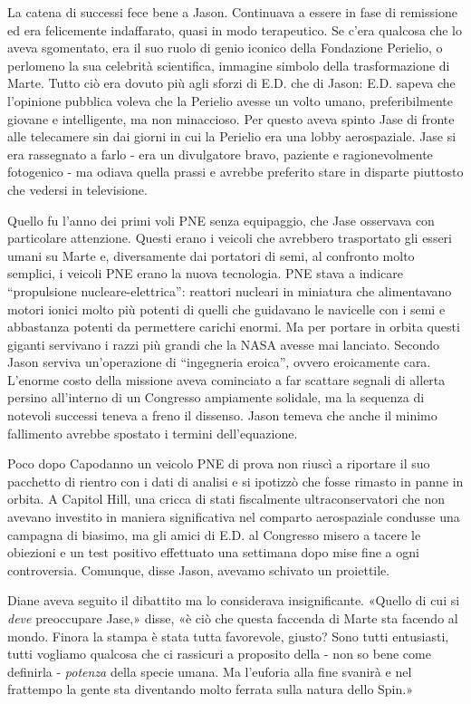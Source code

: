 La catena di successi fece bene a Jason. Continuava a essere in fase di
remissione ed era felicemente indaffarato, quasi in modo terapeutico. Se
c'era qualcosa che lo aveva sgomentato, era il suo ruolo di genio
iconico della Fondazione Perielio, o perlomeno la sua celebrità
scientifica, immagine simbolo della trasformazione di Marte. Tutto ciò
era dovuto più agli sforzi di E.D. che di Jason: E.D. sapeva che
l'opinione pubblica voleva che la Perielio avesse un volto umano,
preferibilmente giovane e intelligente, ma non minaccioso. Per questo
aveva spinto Jase di fronte alle telecamere sin dai giorni in cui la
Perielio era una lobby aerospaziale. Jase si era rassegnato a farlo -
era un divulgatore bravo, paziente e ragionevolmente fotogenico - ma
odiava quella prassi e avrebbe preferito stare in disparte piuttosto che
vedersi in televisione.

Quello fu l'anno dei primi voli PNE senza equipaggio, che Jase osservava
con particolare attenzione. Questi erano i veicoli che avrebbero
trasportato gli esseri umani su Marte e, diversamente dai portatori di
semi, al confronto molto semplici, i veicoli PNE erano la nuova
tecnologia. PNE stava a indicare ``propulsione nucleare-elettrica'':
reattori nucleari in miniatura che alimentavano motori ionici molto più
potenti di quelli che guidavano le navicelle con i semi e abbastanza
potenti da permettere carichi enormi. Ma per portare in orbita questi
giganti servivano i razzi più grandi che la NASA avesse mai lanciato.
Secondo Jason serviva un'operazione di ``ingegneria eroica'', ovvero
eroicamente cara. L'enorme costo della missione aveva cominciato a far
scattare segnali di allerta persino all'interno di un Congresso
ampiamente solidale, ma la sequenza di notevoli successi teneva a freno
il dissenso. Jason temeva che anche il minimo fallimento avrebbe
spostato i termini dell'equazione.

Poco dopo Capodanno un veicolo PNE di prova non riuscì a riportare il
suo pacchetto di rientro con i dati di analisi e si ipotizzò che fosse
rimasto in panne in orbita. A Capitol Hill, una cricca di stati
fiscalmente ultraconservatori che non avevano investito in maniera
significativa nel comparto aerospaziale condusse una campagna di
biasimo, ma gli amici di E.D. al Congresso misero a tacere le obiezioni
e un test positivo effettuato una settimana dopo mise fine a ogni
controversia. Comunque, disse Jason, avevamo schivato un proiettile.

Diane aveva seguito il dibattito ma lo considerava insignificante.
«Quello di cui si \emph{deve} preoccupare Jase,» disse, «è ciò che
questa faccenda di Marte sta facendo al mondo. Finora la stampa è stata
tutta favorevole, giusto? Sono tutti entusiasti, tutti vogliamo qualcosa
che ci rassicuri a proposito della - non so bene come definirla -
\emph{potenza} della specie umana. Ma l'euforia alla fine svanirà e nel
frattempo la gente sta diventando molto ferrata sulla natura dello
Spin.»

